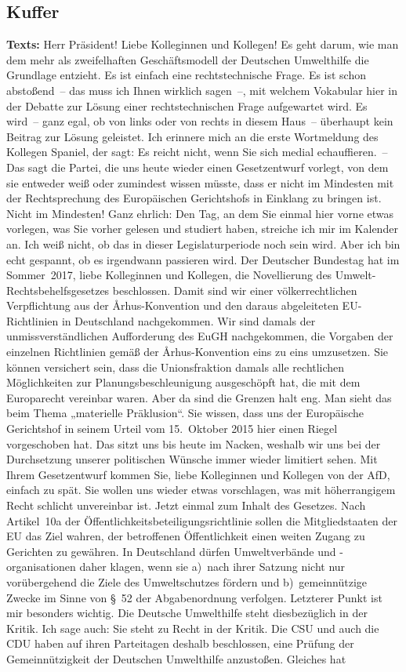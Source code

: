 \documentclass{article}
\begin{document}
\subsection{Kuffer}
\noindent\textbf{Texts:} Herr Präsident! Liebe Kolleginnen und Kollegen! Es geht darum, wie man dem mehr als zweifelhaften Geschäftsmodell der Deutschen Umwelthilfe die Grundlage entzieht.  Es ist einfach eine rechtstechnische Frage. Es ist schon abstoßend – das muss ich Ihnen wirklich sagen –, mit welchem Vokabular hier in der Debatte zur Lösung einer rechtstechnischen Frage aufgewartet wird.  Es wird – ganz egal, ob von links oder von rechts in diesem Haus – überhaupt kein Beitrag zur Lösung geleistet. Ich erinnere mich an die erste Wortmeldung des Kollegen Spaniel, der sagt: Es reicht nicht, wenn Sie sich medial echauffieren. – Das sagt die Partei, die uns heute wieder einen Gesetzentwurf vorlegt, von dem sie entweder weiß oder zumindest wissen müsste, dass er nicht im Mindesten mit der Rechtsprechung des Europäischen Gerichtshofs in Einklang zu bringen ist. Nicht im Mindesten! Ganz ehrlich: Den Tag, an dem Sie einmal hier vorne etwas vorlegen, was Sie vorher gelesen und studiert haben, streiche ich mir im Kalender an. Ich weiß nicht, ob das in dieser Legislaturperiode noch sein wird. Aber ich bin echt gespannt, ob es irgendwann passieren wird. Der Deutscher Bundestag hat im Sommer 2017, liebe Kolleginnen und Kollegen, die Novellierung des Umwelt-Rechtsbehelfsgesetzes beschlossen. Damit sind wir einer völkerrechtlichen Verpflichtung aus der Århus-Konvention und den daraus abgeleiteten EU-Richtlinien in Deutschland nachgekommen. Wir sind damals der unmissverständlichen Aufforderung des EuGH nachgekommen, die Vorgaben der einzelnen Richtlinien gemäß der Århus-Konvention eins zu eins umzusetzen. Sie können versichert sein, dass die Unionsfraktion damals alle rechtlichen Möglichkeiten zur Planungsbeschleunigung ausgeschöpft hat, die mit dem Europarecht vereinbar waren. Aber da sind die Grenzen halt eng. Man sieht das beim Thema „materielle Präklusion“. Sie wissen, dass uns der Europäische Gerichtshof in seinem Urteil vom 15. Oktober 2015 hier einen Riegel vorgeschoben hat. Das sitzt uns bis heute im Nacken, weshalb wir uns bei der Durchsetzung unserer politischen Wünsche immer wieder limitiert sehen.  Mit Ihrem Gesetzentwurf kommen Sie, liebe Kolleginnen und Kollegen von der AfD, einfach zu spät. Sie wollen uns wieder etwas vorschlagen, was mit höherrangigem Recht schlicht unvereinbar ist. Jetzt einmal zum Inhalt des Gesetzes. Nach Artikel 10a der Öffentlichkeitsbeteiligungsrichtlinie sollen die Mitgliedstaaten der EU das Ziel wahren, der betroffenen Öffentlichkeit einen weiten Zugang zu Gerichten zu gewähren. In Deutschland dürfen Umweltverbände und -organisationen daher klagen, wenn sie a) nach ihrer Satzung nicht nur vorübergehend die Ziele des Umweltschutzes fördern und b) gemeinnützige Zwecke im Sinne von § 52 der Abgabenordnung verfolgen. Letzterer Punkt ist mir besonders wichtig. Die Deutsche Umwelthilfe steht diesbezüglich in der Kritik. Ich sage auch: Sie steht zu Recht in der Kritik. Die CSU und auch die CDU haben auf ihren Parteitagen deshalb beschlossen, eine Prüfung der Gemeinnützigkeit der Deutschen Umwelthilfe anzustoßen.  Gleiches hat 
\end{document}
